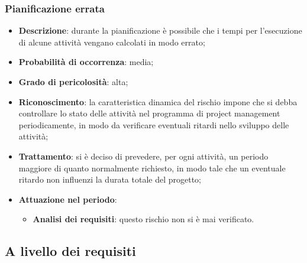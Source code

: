 		\subsubsection{Pianificazione errata}
		\begin{itemize}
			\item \textbf{Descrizione}: durante la pianificazione è possibile che i tempi per l'esecuzione di alcune attività vengano calcolati in modo errato;
			\item \textbf{Probabilità di occorrenza}: media;
			\item \textbf{Grado di pericolosità}: alta;
			\item \textbf{Riconoscimento}: la caratteristica dinamica del rischio impone che si debba controllare lo stato delle attività nel programma di project management periodicamente, in modo da verificare eventuali ritardi nello sviluppo delle attività;	
			\item \textbf{Trattamento}: si è deciso di prevedere, per ogni attività, un periodo maggiore di quanto normalmente richiesto, in modo tale che un eventuale ritardo non influenzi la durata totale del progetto;
			\item \textbf{Attuazione nel periodo}:
			\begin{itemize}
				\item \textbf{Analisi dei requisiti}: questo rischio non si è mai verificato.
			\end{itemize}
		\end{itemize}
	
	\subsection{A livello dei requisiti}
	
